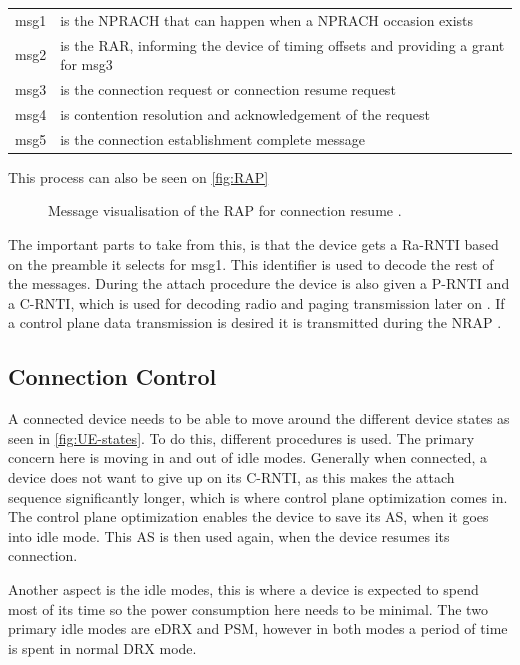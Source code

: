 \begin{tabular}{ll}
msg1 & is the NPRACH that can happen when a NPRACH occasion exists \\
msg2 & is the \gls{RAR}, informing the device of timing offsets and providing a grant for msg3 \\
msg3 & is the connection request or connection resume request \\
msg4 & is contention resolution and acknowledgement of the request \\
msg5 & is the connection establishment complete message\\
\end{tabular}

This process can also be seen on \autoref{fig:RAP}


\begin{figure}[H]
\centering

\caption{Message visualisation of the \gls{RAP} for connection resume \citep{NB-IoT_Book}.}
\label{fig:RAP}
\end{figure}

The important parts to take from this, is that the device gets a \gls{Ra-RNTI} based on the preamble it selects for msg1. This identifier is used to decode the rest of the messages. During the attach procedure the device is also given a \gls{P-RNTI} and a \gls{C-RNTI}, which is used for decoding radio and paging transmission later on \citep{whitepaper}. If a control plane data transmission is desired it is transmitted during the \gls{NRAP} \citep{primer}.


\subsection{Connection Control}
A connected device needs to be able to move around the different device states as seen in \autoref{fig:UE-states}. To do this, different procedures is used. The primary concern here is moving in and out of idle modes. Generally when connected, a device does not want to give up on its \gls{C-RNTI}, as this makes the attach sequence significantly longer, which is where control plane optimization comes in. The control plane optimization enables the device to save its \gls{AS}, when it goes into idle mode. This \gls{AS} is then used again, when the device resumes its connection. 

Another aspect is the idle modes, this is where a device is expected to spend most of its time so the power consumption here needs to be minimal. The two primary idle modes are \gls{eDRX} and \gls{PSM}, however in both modes a period of time is spent in normal DRX mode. 


